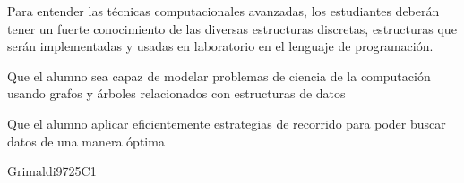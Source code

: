 \begin{syllabus}


\begin{justification}
Para entender las técnicas computacionales avanzadas, los estudiantes deberán tener un fuerte conocimiento de las
diversas estructuras discretas, estructuras que serán implementadas y usadas en laboratorio en el lenguaje de programación.
\end{justification}

\begin{goals}
\item Que el alumno sea capaz de modelar problemas de ciencia de la computación usando grafos y árboles relacionados con estructuras de datos
\item Que el alumno aplicar eficientemente estrategias de recorrido para poder buscar datos de una manera óptima
\end{goals}

\begin{outcomes}
    \item {}
    \item {}	
    \item {}
\end{outcomes}

\begin{competences}
    \item {}
    \item {}
\end{competences}

\begin{unit}{\DSBasicsofCounting}{}{Grimaldi97}{25}{C1} 
    \begin{topics}
        \item \DSBasicsofCountingTopicCounting
	\item \DSBasicsofCountingTopicThePigeonhole
	\item \DSBasicsofCountingTopicPermutations
	\item \DSBasicsofCountingTopicSolving
	\item \DSBasicsofCountingTopicBasic
   \end{topics}
   \begin{learningoutcomes}
	\item \DSBasicsofCountingLOApplyCounting [\Familiarity]
	\item \DSBasicsofCountingLOApplyThe[\Familiarity]
	\item \DSBasicsofCountingLOComputePermutations[\Familiarity]
	\item \DSBasicsofCountingLOMap[\Familiarity]
	\item \DSBasicsofCountingLOSolveA[\Familiarity]
	\item \DSBasicsofCountingLOAnalyzeA[\Familiarity]
	\item \DSBasicsofCountingLOPerformComputations[\Familiarity]
   \end{learningoutcomes}
\end{unit}


\end{syllabus}
